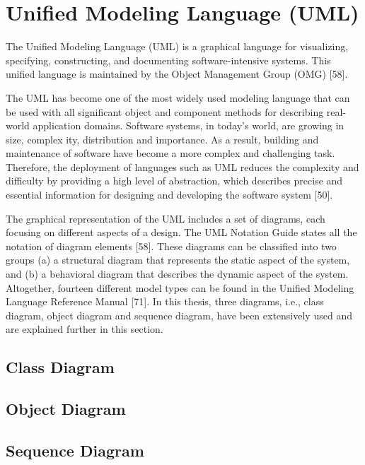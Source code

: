 
\section{Unified Modeling Language (UML)}

\hspace{1cm} The Unified Modeling Language (UML) is a graphical language for 
visualizing, specifying, constructing, and documenting software-intensive systems.
This unified language is maintained by the Object Management Group (OMG) [58].

The UML has become one of the most widely used modeling language that can
be used with all significant object and component methods for describing real-world
application domains. Software systems, in today’s world, are growing in size, complex
ity, distribution and importance. As a result, building and maintenance of software
have become a more complex and challenging task. Therefore, the deployment of
languages such as UML reduces the complexity and difficulty by providing a high
level of abstraction, which describes precise and essential information for designing
and developing the software system [50].  

The graphical representation of the UML includes a set of diagrams, each focusing
on different aspects of a design. The UML Notation Guide states all the notation of 
diagram elements [58]. These diagrams can be classified into two groups (a) a structural
diagram that represents the static aspect of the system, and (b) a behavioral diagram
that describes the dynamic aspect of the system. Altogether, fourteen different model
types can be found in the Unified Modeling Language Reference Manual [71]. In this
thesis, three diagrams, i.e., class diagram, object diagram and sequence diagram, have
been extensively used and are explained further in this section.

\subsection{Class Diagram}

\subsection{Object Diagram}

\subsection{Sequence Diagram}